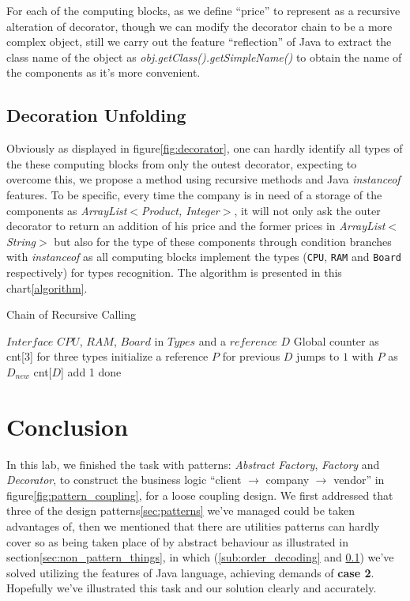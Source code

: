 \documentclass[a4paper]{article}
\begin{document}
For each of the computing blocks, as we define ``price'' to
represent as a recursive alteration of decorator,
though we can modify the decorator chain to be a more
complex object, still we carry out the feature ``reflection''
of Java to extract the class name of the object as \textsl{obj.getClass().getSimpleName()}
to obtain the name of the components as it's more convenient.

\subsection{Decoration Unfolding}%
\label{sub:decoration_unfolding}

Obviously as displayed in figure\ref{fig:decorator},
one can hardly identify all types of the these computing blocks from only
the outest decorator,
expecting to overcome this, we propose a method using recursive
methods and Java \textsl{instanceof} features. To be specific,
every time the company is in need of a storage of the
components as \textsl{ArrayList$<$Product, Integer$>$},
it will not only ask the outer decorator to return an addition of
his price and the former prices in \textsl{ArrayList$<$String$>$} but also for
the type of these components through condition branches with \textsl{instanceof} as all computing blocks
implement the types (\texttt{CPU}, \texttt{RAM} and \texttt{Board} respectively)
for types recognition.
The algorithm is presented in this chart\ref{algorithm}.


\begin{algorithm}\label{algorithm}
\caption{Chain of Recursive Calling}
\begin{algorithmic}[1]
    \REQUIRE $Interface$ $CPU$, $RAM$, $Board$ in $Types$ and a $reference$ $D$
    \REQUIRE Global counter as cnt[3] for three types
    \STATE initialize a reference $P$ for previous $D$
        \STATE jumps to $1$ with $P$ as $D_{new}$
    \ENDIF
    \STATE cnt[$D$] add 1
    \ENDIF
    \STATE done
\end{algorithmic}
\end{algorithm}

\section{Conclusion}%
\label{sec:conclusion}

In this lab, we finished the task with patterns: \textit{Abstract Factory}, \textit{Factory}
and \textit{Decorator}, to construct the business logic ``client $\to$ company $\to$ vendor'' in figure\ref{fig:pattern_coupling},
for a loose coupling design. We first addressed that three of the design patterns\ref{sec:patterns} we've managed
could be taken advantages of, then we mentioned that there are
utilities patterns can hardly cover so as being taken place of
by abstract behaviour as illustrated in section\ref{sec:non_pattern_things},
in which (\ref{sub:order_decoding} and \ref{sub:decoration_unfolding})
we've solved utilizing the features of Java language, achieving demands
of \textbf{case 2}. Hopefully we've illustrated this task and
our solution clearly and accurately.
\end{document}
